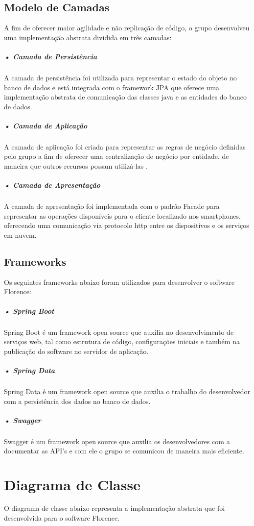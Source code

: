 \documentclass[portuguese,oneside]{tcc}
\begin{document}
\subsection{Modelo de Camadas}
A fim de oferecer maior agilidade e não replicação de código, o grupo desenvolveu uma implementação abstrata dividida em três camadas:

\subparagraph{• Camada de Persistência}
A camada de persistência foi utilizada para representar o estado do objeto no banco de dados \cite{CAMADASPERSISTENCIA} e está integrada com o framework JPA que oferece uma implementação abstrata de comunicação das classes java e as entidades do banco de dados.

\subparagraph{• Camada de Aplicação}
A camada de aplicação foi criada para representar as regras de negócio definidas pelo grupo a fim de oferecer uma centralização de negócio por entidade, de maneira que outros recursos possam utilizá-las \cite{CAMADAAPLICACAO}.


\subparagraph{• Camada de Apresentação}
A camada de apresentação foi implementada com o padrão Facade para representar as operações disponíveis para o cliente localizado nos smartphones, oferecendo uma comunicação via protocolo http entre os dispositivos e os serviços em nuvem.

\subsection{Frameworks}
Os seguintes frameworks abaixo foram utilizados para desenvolver o software Florence:

\subparagraph{• Spring Boot}
Spring Boot é um framework open source que auxilia no desenvolvimento de serviços web, tal como estrutura de código, configurações iniciais e também na publicação do software no servidor de aplicação.

\subparagraph{• Spring Data}
Spring Data é um framework open source que auxilia o trabalho do desenvolvedor com a persistência dos dados no banco de dados.

\subparagraph{• Swagger}
Swagger é um framework open source que auxilia os desenvolvedores com a documentar as API's e com ele o grupo se comunicou de maneira mais eficiente.

\newpage

\section{Diagrama de Classe}
O diagrama de classe abaixo representa a implementação abstrata que foi desenvolvida para o software Florence.
\end{document}
